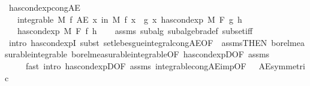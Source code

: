 \begin{isabellebody}
%
\endisadelimproof
\isanewline
{}\isamarkupfalse%
\ has{\isacharunderscore}{\kern0pt}cond{\isacharunderscore}{\kern0pt}exp{\isacharunderscore}{\kern0pt}cong{\isacharunderscore}{\kern0pt}AE{\isacharcolon}{\kern0pt}\isanewline
\ \ \ {\isachardoublequoteopen}integrable\ M\ f{\isachardoublequoteclose}\ {\isachardoublequoteopen}AE\ x\ in\ M{\isachardot}{\kern0pt}\ f\ x\ {\isacharequal}{\kern0pt}\ g\ x{\isachardoublequoteclose}\ {\isachardoublequoteopen}has{\isacharunderscore}{\kern0pt}cond{\isacharunderscore}{\kern0pt}exp\ M\ F\ g\ h{\isachardoublequoteclose}\isanewline
\ \ \ {\isachardoublequoteopen}has{\isacharunderscore}{\kern0pt}cond{\isacharunderscore}{\kern0pt}exp\ M\ F\ f\ h{\isachardoublequoteclose}\isanewline
%
\isadelimproof
\ \ %
\endisadelimproof
%
\isatagproof
{}\isamarkupfalse%
\ assms{\isacharparenleft}{\kern0pt}{}{\isacharcomma}{\kern0pt}{}{\isacharparenright}{\kern0pt}\ subalg\ subalgebra{\isacharunderscore}{\kern0pt}def\ subset{\isacharunderscore}{\kern0pt}iff\ \isanewline
\ \ \isamarkupfalse%
\ {\isacharparenleft}{\kern0pt}intro\ has{\isacharunderscore}{\kern0pt}cond{\isacharunderscore}{\kern0pt}expI{\isacharprime}{\kern0pt}{\isacharcomma}{\kern0pt}\ subst\ set{\isacharunderscore}{\kern0pt}lebesgue{\isacharunderscore}{\kern0pt}integral{\isacharunderscore}{\kern0pt}cong{\isacharunderscore}{\kern0pt}AE{\isacharbrackleft}{\kern0pt}OF\ {\isacharunderscore}{\kern0pt}\ assms{\isacharparenleft}{\kern0pt}{}{\isacharparenright}{\kern0pt}{\isacharbrackleft}{\kern0pt}THEN\ borel{\isacharunderscore}{\kern0pt}measurable{\isacharunderscore}{\kern0pt}integrable{\isacharbrackright}{\kern0pt}\ borel{\isacharunderscore}{\kern0pt}measurable{\isacharunderscore}{\kern0pt}integrable{\isacharparenleft}{\kern0pt}{}{\isacharparenright}{\kern0pt}{\isacharbrackleft}{\kern0pt}OF\ has{\isacharunderscore}{\kern0pt}cond{\isacharunderscore}{\kern0pt}expD{\isacharparenleft}{\kern0pt}{}{\isacharparenright}{\kern0pt}{\isacharbrackleft}{\kern0pt}OF\ assms{\isacharparenleft}{\kern0pt}{}{\isacharparenright}{\kern0pt}{\isacharbrackright}{\kern0pt}{\isacharbrackright}{\kern0pt}{\isacharbrackright}{\kern0pt}{\isacharparenright}{\kern0pt}\ \isanewline
\ \ \ \ \ {\isacharparenleft}{\kern0pt}fast\ intro{\isacharcolon}{\kern0pt}\ has{\isacharunderscore}{\kern0pt}cond{\isacharunderscore}{\kern0pt}expD{\isacharbrackleft}{\kern0pt}OF\ assms{\isacharparenleft}{\kern0pt}{}{\isacharparenright}{\kern0pt}{\isacharbrackright}{\kern0pt}\ integrable{\isacharunderscore}{\kern0pt}cong{\isacharunderscore}{\kern0pt}AE{\isacharunderscore}{\kern0pt}imp{\isacharbrackleft}{\kern0pt}OF\ {\isacharunderscore}{\kern0pt}\ {\isacharunderscore}{\kern0pt}\ AE{\isacharunderscore}{\kern0pt}symmetric{\isacharbrackright}{\kern0pt}{\isacharparenright}{\kern0pt}{\isacharplus}{\kern0pt}%

\end{isabellebody}
